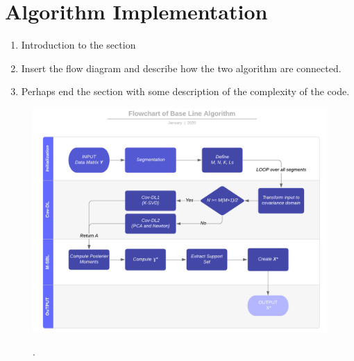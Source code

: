 \section{Algorithm Implementation}

\begin{enumerate}
\item Introduction to the section
\item Insert the flow diagram and describe how the two algorithm are connected.
\item Perhaps end the section with some description of the complexity of the code.
\end{enumerate}

\begin{figure}[H]
\centering
\includegraphics[scale=0.5]{figures/chapter6/Flowchart.png}
\label{fig:flow}
\caption{.}
\end{figure}
\noindent
